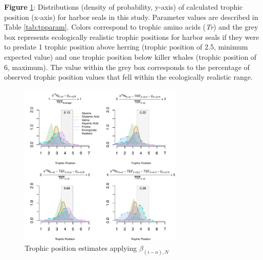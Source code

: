 \documentclass [11pt, proquest] {uwthesis}[2015/03/03]
\begin{document}
\textbf{Figure} \ref{fig:nbeta}: Distributions (density of probability,
y-axis) of calculated trophic position (x-axis) for harbor seals in this
study. Parameter values are described in Table \ref{tab:tpparam}. Colors
correspond to trophic amino acids (\emph{Tr}) and the grey box
represents ecologically realistic trophic positions for harbor seals if
they were to predate 1 trophic position above herring (trophic position
of 2.5, minimum expected value) and one trophic position below killer
whales (trophic position of 6, maximum). The value within the grey box
corresponds to the percentage of observed trophic position values that
fell within the ecologically realistic range. \newline 
\begin{figure}[h]
\centering
  \includegraphics[width=0.7\textwidth]{figure/Ch3/FigureS2.pdf}
  \caption{Trophic position estimates applying $\beta_{(i-o),N}$}
  \label{fig:nbeta}
\end{figure}
\clearpage
\end{document}
